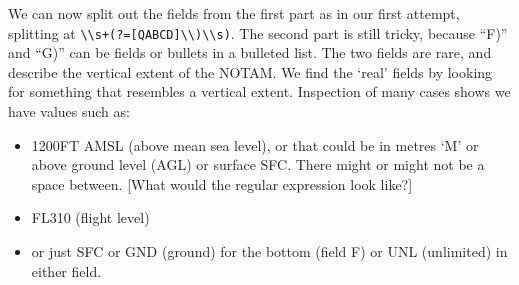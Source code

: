 \documentclass[
]{book}
\newenvironment{Shaded}{\begin{snugshade}}{\end{snugshade}}
\newcommand{\AttributeTok}[1]{\textcolor[rgb]{0.77,0.63,0.00}{#1}}
\newcommand{\CommentTok}[1]{\textcolor[rgb]{0.56,0.35,0.01}{\textit{#1}}}
\newcommand{\DecValTok}[1]{\textcolor[rgb]{0.00,0.00,0.81}{#1}}
\newcommand{\FunctionTok}[1]{\textcolor[rgb]{0.00,0.00,0.00}{#1}}
\newcommand{\NormalTok}[1]{#1}
\newcommand{\OtherTok}[1]{\textcolor[rgb]{0.56,0.35,0.01}{#1}}
\newcommand{\SpecialCharTok}[1]{\textcolor[rgb]{0.00,0.00,0.00}{#1}}
\newcommand{\StringTok}[1]{\textcolor[rgb]{0.31,0.60,0.02}{#1}}
\providecommand{\tightlist}{%
  \setlength{\itemsep}{0pt}\setlength{\parskip}{0pt}}
\begin{document}
\begin{Shaded}
\end{Shaded}

We can now split out the fields from the first part as in our first attempt, splitting at \texttt{\textbackslash{}\textbackslash{}s+(?={[}QABCD{]}\textbackslash{}\textbackslash{})\textbackslash{}\textbackslash{}s)}. The second part is still tricky, because ``F)'' and ``G)'' can be fields or bullets in a bulleted list. The two fields are rare, and describe the vertical extent of the NOTAM. We find the `real' fields by looking for something that resembles a vertical extent. Inspection of many cases shows we have values such as:

\begin{itemize}
\tightlist
\item
  1200FT AMSL (above mean sea level), or that could be in metres `M' or above ground level (AGL) or surface SFC. There might or might not be a space between. {[}What would the regular expression look like?{]}
\item
  FL310 (flight level)
\item
  or just SFC or GND (ground) for the bottom (field F) or UNL (unlimited) in either field.
\end{itemize}
\end{document}
